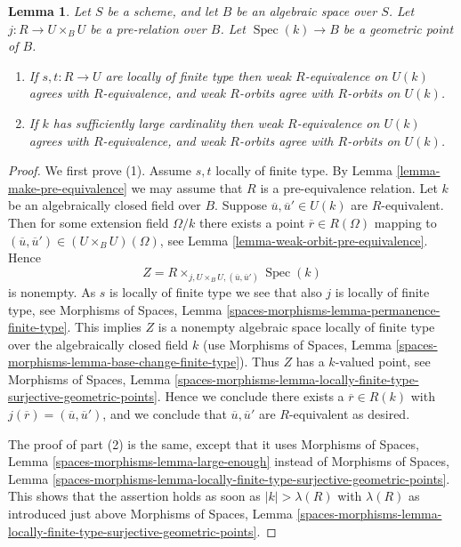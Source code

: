 \documentclass[10pt,a4paper]{amsart}
\theoremstyle{plain}
\newtheorem{lemma}[subsection]{Lemma}
\theoremstyle{definition}
\theoremstyle{remark}
\numberwithin{equation}{subsection}
\def\Spec{\mathop{\mathrm{Spec}}}
\begin{document}
\begin{lemma}
\label{lemma-geometric-orbits}
Let $S$ be a scheme, and let $B$ be an algebraic space over $S$.
Let $j : R \to U \times_B U$ be a pre-relation over $B$.
Let $\Spec(k) \to B$ be a geometric point of $B$.
\begin{enumerate}
\item If $s, t : R \to U$ are locally of finite type
then weak $R$-equivalence on $U(k)$ agrees with $R$-equivalence, and
weak $R$-orbits agree with $R$-orbits on $U(k)$.
\item If $k$ has sufficiently large cardinality then weak $R$-equivalence
on $U(k)$ agrees with $R$-equivalence, and weak $R$-orbits agree
with $R$-orbits on $U(k)$.
\end{enumerate}
\end{lemma}

\begin{proof}
We first prove (1). Assume $s, t$ locally of finite type. By
Lemma \ref{lemma-make-pre-equivalence}
we may assume that $R$ is a pre-equivalence relation.
Let $k$ be an algebraically closed field over $B$.
Suppose $\overline{u}, \overline{u}' \in U(k)$ are $R$-equivalent.
Then for some extension field $\Omega/k$ there exists
a point $\overline{r} \in R(\Omega)$ mapping to
$(\overline{u}, \overline{u}') \in (U \times_B U)(\Omega)$, see
Lemma \ref{lemma-weak-orbit-pre-equivalence}.
Hence
$$
Z = R \times_{j, U \times_B U, (\overline{u}, \overline{u}')} \Spec(k)
$$
is nonempty. As $s$ is locally of finite type we see that
also $j$ is locally of finite type, see
Morphisms of Spaces, Lemma \ref{spaces-morphisms-lemma-permanence-finite-type}.
This implies $Z$ is a nonempty algebraic space locally of finite type
over the algebraically closed field $k$ (use
Morphisms of Spaces,
Lemma \ref{spaces-morphisms-lemma-base-change-finite-type}).
Thus $Z$ has a $k$-valued point, see
Morphisms of Spaces, Lemma
\ref{spaces-morphisms-lemma-locally-finite-type-surjective-geometric-points}.
Hence we conclude there exists a $\overline{r} \in R(k)$ with
$j(\overline{r}) = (\overline{u}, \overline{u}')$, and we conclude that
$\overline{u}, \overline{u}'$ are $R$-equivalent as desired.

\medskip\noindent
The proof of part (2) is the same, except that it uses
Morphisms of Spaces, Lemma
\ref{spaces-morphisms-lemma-large-enough}
instead of
Morphisms of Spaces, Lemma
\ref{spaces-morphisms-lemma-locally-finite-type-surjective-geometric-points}.
This shows that the assertion holds as soon as $|k| > \lambda(R)$ with
$\lambda(R)$ as introduced just above
Morphisms of Spaces, Lemma
\ref{spaces-morphisms-lemma-locally-finite-type-surjective-geometric-points}.
\end{proof}
\end{document}
